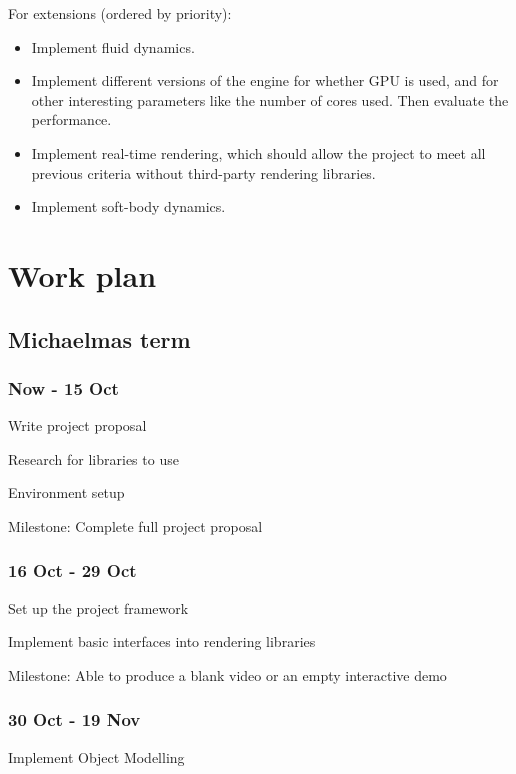 \documentclass[12pt,a4paper,twoside]{article}
\begin{document}
For extensions (ordered by priority):

\begin{itemize}
\item Implement fluid dynamics.

\item Implement different versions of the engine for whether GPU is used, and for other interesting parameters like the number of cores used. 
Then evaluate the performance.

\item Implement real-time rendering, which should allow the project to meet all previous criteria without third-party rendering libraries. 

\item Implement soft-body dynamics.
\end{itemize}

\section*{Work plan}

\subsection*{Michaelmas term}

\subsubsection*{Now - 15 Oct}

Write project proposal

Research for libraries to use

Environment setup

Milestone: Complete full project proposal

\subsubsection*{16 Oct - 29 Oct}

Set up the project framework

Implement basic interfaces into rendering libraries

Milestone: Able to produce a blank video or an empty interactive demo

\subsubsection*{30 Oct - 19 Nov}

Implement Object Modelling
\end{document}
